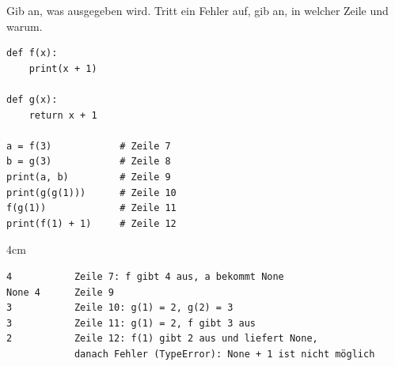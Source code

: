 \question[3]
Gib an, was ausgegeben wird. Tritt ein Fehler auf, gib an, in welcher Zeile und warum.
\begin{lstlisting}
def f(x):
    print(x + 1)

def g(x):
    return x + 1

a = f(3)            # Zeile 7
b = g(3)            # Zeile 8
print(a, b)         # Zeile 9
print(g(g(1)))      # Zeile 10
f(g(1))             # Zeile 11
print(f(1) + 1)     # Zeile 12
\end{lstlisting}

\begin{solutionbox}{4cm}
\begin{lstlisting}[language={}]
4           Zeile 7: f gibt 4 aus, a bekommt None
None 4      Zeile 9
3           Zeile 10: g(1) = 2, g(2) = 3
3           Zeile 11: g(1) = 2, f gibt 3 aus
2           Zeile 12: f(1) gibt 2 aus und liefert None,
            danach Fehler (TypeError): None + 1 ist nicht möglich
\end{lstlisting}
\end{solutionbox}
